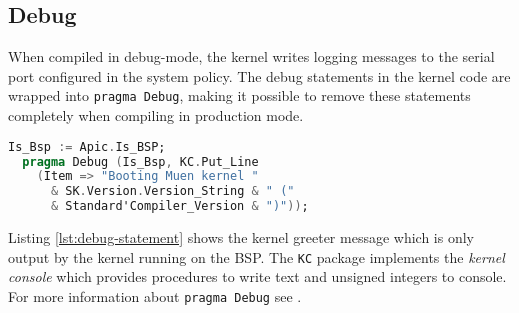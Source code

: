 \subsection{Debug}\label{subsec:debug}
When compiled in debug-mode, the kernel writes logging messages to
the serial port configured in the system policy. The debug statements in the
kernel code are wrapped into \texttt{pragma Debug}, making it
possible to remove these statements completely when compiling in production
mode.

\begin{lstlisting}[language=Ada, label=lst:debug-statement, caption=Kernel debug
statement]
  Is_Bsp := Apic.Is_BSP;
  pragma Debug (Is_Bsp, KC.Put_Line
    (Item => "Booting Muen kernel "
      & SK.Version.Version_String & " ("
      & Standard'Compiler_Version & ")"));
\end{lstlisting}

Listing \ref{lst:debug-statement} shows the kernel greeter message which is only
output by the kernel running on the BSP. The \texttt{KC}
package implements the \emph{kernel console} which provides procedures to write
text and unsigned integers to console. For more information about \texttt{pragma
Debug} see \cite{GNAT:manual}.
